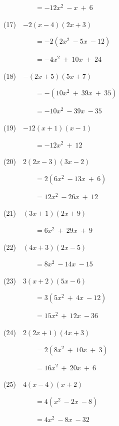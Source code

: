 \documentclass[a4j,twocolumn,10pt,fleqn]{jarticle}
\begin{document}
~~~~~~~~~$=-12x^2~-x~+~6$

(17)~~$-2(x-4)(2x+3)$

~~~~~~~~~$=-2(2x^2~-5x~-12)$

~~~~~~~~~$=-4x^2~+~10x~+~24$

(18)~~$-(2x+5)(5x+7)$

~~~~~~~~~$=-(10x^2~+~39x~+~35)$

~~~~~~~~~$=-10x^2~-39x~-35$

(19)~~$-12(x+1)(x-1)$

~~~~~~~~~$=-12x^2~+~12$

(20)~~$2(2x-3)(3x-2)$

~~~~~~~~~$=2(6x^2~-13x~+~6)$

~~~~~~~~~$=12x^2~-26x~+~12$

(21)~~$(3x+1)(2x+9)$

~~~~~~~~~$=6x^2~+~29x~+~9$

(22)~~$(4x+3)(2x-5)$

~~~~~~~~~$=8x^2~-14x~-15$

(23)~~$3(x+2)(5x-6)$

~~~~~~~~~$=3(5x^2~+~4x~-12)$

~~~~~~~~~$=15x^2~+~12x~-36$

(24)~~$2(2x+1)(4x+3)$

~~~~~~~~~$=2(8x^2~+~10x~+~3)$

~~~~~~~~~$=16x^2~+~20x~+~6$

(25)~~$4(x-4)(x+2)$

~~~~~~~~~$=4(x^2~-2x~-8)$

~~~~~~~~~$=4x^2~-8x~-32$
\end{document}
